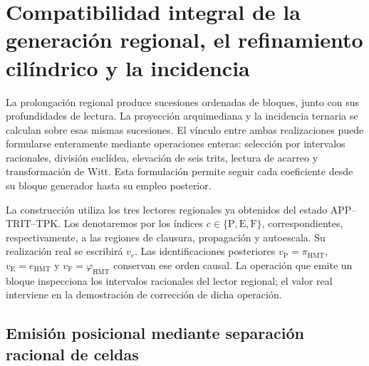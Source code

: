 
\section[Generación regional y refinamiento]{Compatibilidad integral de la generación regional, el refinamiento cilíndrico y la incidencia}
\label{sec:df-lectores-cilindros}

La prolongación regional produce sucesiones ordenadas de bloques, junto con
sus profundidades de lectura. La proyección arquimediana y la incidencia
ternaria se calculan sobre esas mismas sucesiones. El vínculo entre ambas
realizaciones puede formularse enteramente mediante operaciones enteras:
selección por intervalos racionales, división euclídea, elevación de seis
trits, lectura de acarreo y transformación de Witt. Esta formulación permite
seguir cada coeficiente desde su bloque generador hasta su empleo posterior.

La construcción utiliza los tres lectores regionales ya obtenidos del estado
APP--TRIT--TPK. Los denotaremos por los índices
\(c\in\{\mathrm P,\mathrm E,\mathrm F\}\), correspondientes, respectivamente,
a las regiones de clausura, propagación y autoescala. Su realización real se
escribirá \(v_c\). Las identificaciones posteriores
\(v_{\mathrm P}=\pi_{\mathrm{HMT}}\),
\(v_{\mathrm E}=e_{\mathrm{HMT}}\) y
\(v_{\mathrm F}=\varphi_{\mathrm{HMT}}\) conservan ese orden causal.
La operación que emite un bloque inspecciona los intervalos racionales del
lector regional; el valor real interviene en la demostración de corrección
de dicha operación.

\subsection{Emisión posicional mediante separación racional de celdas}
\label{subsec:df-emision-racional}


